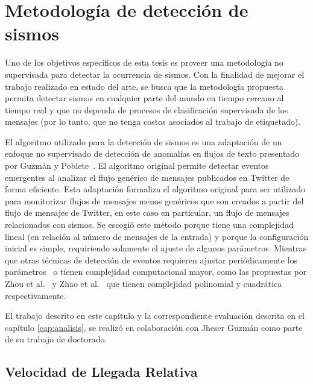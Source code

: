 \chapter{Metodología de detección de sismos}
\label{cap:deteccion}

Uno de los objetivos específicos de esta tesis es proveer una metodología no supervisada para detectar la ocurrencia de sismos. 
%
Con la finalidad de mejorar el trabajo realizado en estado del arte, se busca que la metodología propuesta permita detectar sismos en cualquier parte del mundo en tiempo cercano al tiempo real y que no dependa de procesos de clasificación supervisada de los mensajes (por lo tanto, que no tenga costos asociados al trabajo de etiquetado). 


El algoritmo utilizado para la detección de sismos es una adaptación de un enfoque no supervisado de detección de anomalías en flujos de texto presentado por Guzmán y Poblete~\cite{guzman2013line}. 
%
El algoritmo original permite detectar eventos emergentes al analizar el flujo genérico de mensajes publicados en Twitter de forma eficiente.  
%
Esta adaptación formaliza el algoritmo original para ser utilizado para monitorizar 
flujos de mensajes menos genéricos que son creados a partir del flujo de mensajes de Twitter, en este caso en particular, un flujo de mensajes relacionados con sismos.
%
Se escogió este método porque tiene una complejidad lineal (en relación al número de mensajes de la entrada) y porque la configuración inicial es simple, requiriendo solamente el ajuste de algunos parámetros.
%
Mientras que otras técnicas de detección de eventos requieren ajustar periódicamente los parámetros~\cite{mathioudakis2010twittermonitor,sankaranarayanan2009twitterstand} o tienen complejidad computacional mayor, como las propuestas por Zhou et al.~\cite{zhou2015unsupervised} y Zhao et al.~\cite{zhao2014unsupervised} que tienen complejidad polinomial y cuadrática respectivamente. 

El trabajo descrito en este capítulo y la correspondiente evaluación descrita en el capítulo \ref{cap:analisis}, se realizó en colaboración con Jheser Guzmán como parte de su trabajo de doctorado.


\section{Velocidad de Llegada Relativa}


